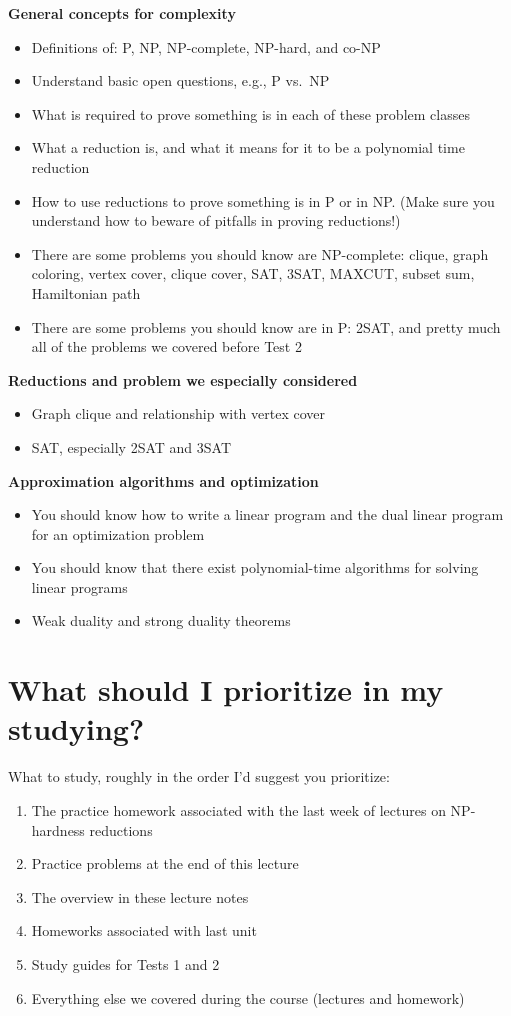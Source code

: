 \documentclass[11  pt]{exam}
\begin{document}
\textbf{General concepts for complexity}
\begin{itemize}
	\item Definitions of: P, NP, NP-complete, NP-hard, and co-NP
	\item Understand basic open questions, e.g., P vs.\ NP
	\item What is required to prove something is in each of these problem classes
	\item What a reduction is, and what it means for it to be a polynomial time reduction
	\item How to use reductions to prove something is in P or in NP. (Make sure you understand how to beware of pitfalls in proving reductions!)
	\item There are some problems you should know are NP-complete: clique, graph coloring, vertex cover, clique cover, SAT, 3SAT, MAXCUT, subset sum, Hamiltonian path
	\item There are some problems you should know are in P: 2SAT, and pretty much all of the problems we covered before Test 2
\end{itemize}

\textbf{Reductions and problem we especially considered}
\begin{itemize}
	\item Graph clique and relationship with vertex cover
	\item SAT, especially 2SAT and 3SAT
\end{itemize}

\textbf{Approximation algorithms and optimization}
\begin{itemize}
	\item You should know how to write a linear program and the dual linear program for an optimization problem
	\item You should know that there exist polynomial-time algorithms for solving linear programs
	\item Weak duality and strong duality theorems
\end{itemize}

\newpage
\section{What should I prioritize in my studying?}
What to study, roughly in the order I'd suggest you prioritize:
\begin{enumerate}
	\item The practice homework associated with the last week of lectures on NP-hardness reductions
	\item Practice problems at the end of this lecture
	\item The overview in these lecture notes
	\item Homeworks associated with last unit
	\item Study guides for Tests 1 and 2
	\item Everything else we covered during the course (lectures and homework)
\end{enumerate}
\end{document}
